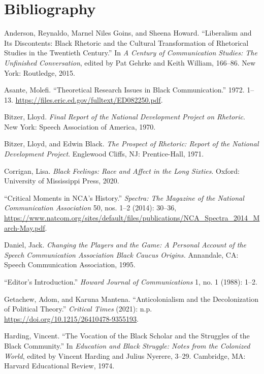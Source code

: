\documentclass{tufte-handout}
\begin{document}
\section{Bibliography}\label{bibliography}

\begin{hangparas}{.25in}{1} 



Anderson, Reynaldo, Marnel Niles Goins, and Sheena Howard. ``Liberalism
and Its Discontents: Black Rhetoric and the Cultural Transformation of
Rhetorical Studies in the Twentieth Century.'' In \emph{A Century of
Communication Studies: The Unfinished Conversation}, edited by Pat
Gehrke and Keith William, 166--86. New York: Routledge, 2015.

Asante, Molefi. ``Theoretical Research Issues in Black Communication.''
1972. 1--13. \url{https://files.eric.ed.gov/fulltext/ED082250.pdf}.

Bitzer, Lloyd. \emph{Final Report of the National Development Project on
Rhetoric}. New York: Speech Association of America, 1970.

Bitzer, Lloyd, and Edwin Black. \emph{The Prospect of Rhetoric: Report
of the National Development Project}. Englewood Cliffs, NJ:
Prentice-Hall, 1971.

Corrigan, Lisa. \emph{Black Feelings: Race and Affect in the Long
Sixties}. Oxford: University of Mississippi Press, 2020.

``Critical Moments in NCA's History.'' \emph{Spectra: The Magazine of
the National Communication Association} 50, nos. 1--2 (2014): 30--36,
\url{https://www.natcom.org/sites/default/files/publications/NCA_Spectra_2014_March-May.pdf}.

Daniel, Jack. \emph{Changing the Players and the Game: A Personal
Account of the Speech Communication Association Black Caucus Origins.}
Annandale, CA: Speech Communication Association, 1995.

``Editor's Introduction.'' \emph{Howard Journal of Communications} 1,
no. 1 (1988): 1--2.

Getachew, Adom, and Karuna Mantena. ``Anticolonialism and the
Decolonization of Political Theory.'' \emph{Critical Times} (2021): n.p.
\url{https://doi.org/10.1215/26410478-9355193}.

Harding, Vincent. ``The Vocation of the Black Scholar and the Struggles
of the Black Community.'' In \emph{Education and Black Struggle: Notes
from the Colonized World}, edited by Vincent Harding and Julius Nyerere,
3--29. Cambridge, MA: Harvard Educational Review, 1974.


\end{hangparas}
\end{document}
